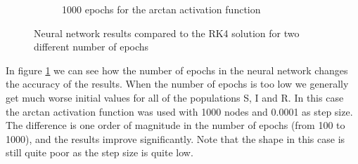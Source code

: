 \begin{figure}[H]
\begin{subfigure}{0.5\textwidth}
		\caption{1000 epochs for the arctan activation function}
	\end{subfigure}
	\caption{Neural network results compared to the RK4 solution for two different number of epochs}
	\label{fig:epochs}
	\end{figure}

	In figure \ref{fig:epochs} we can see how the number of epochs in the neural network changes the accuracy of the results. When the number of epochs is too low we generally get much worse initial values for all of the populations S, I and R. In this case the arctan activation function was used with 1000 nodes and 0.0001 as step size. The difference is one order of magnitude in the number of epochs (from 100 to 1000), and the results improve significantly. Note that the shape in this case is still quite poor as the step size is quite low. 


